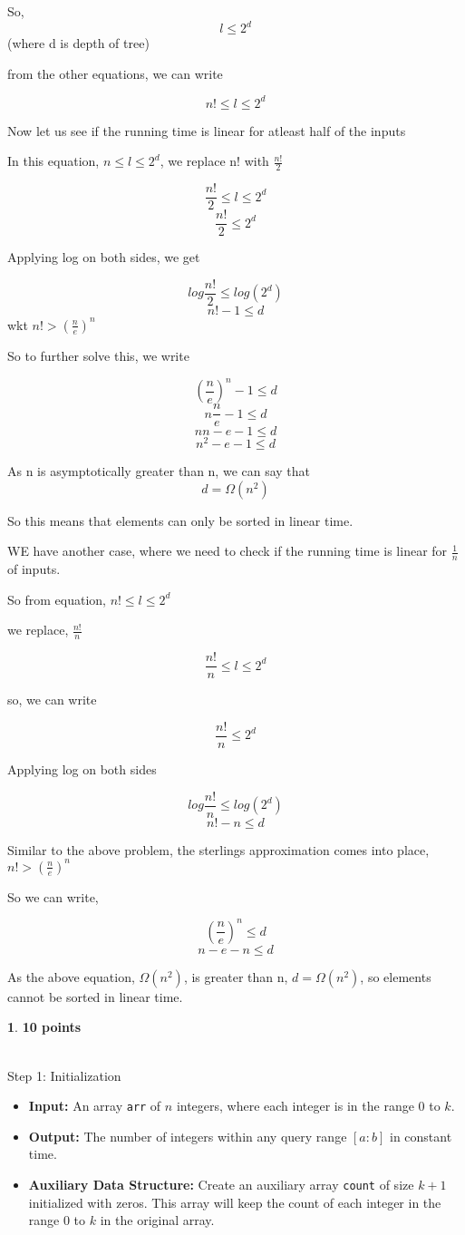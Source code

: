 \documentclass[11pt]{article}
\theoremstyle{definition}
\newtheorem{prob}{}
\newcommand{\solution}{\medskip\noindent{\color{DarkBlue}\textbf{Solution:}}}
\begin{document}
So, \[ l \leq 2^d \] 
\tabto{9cm}(where d is depth of tree)

from the other equations, we can write

\[ n! \leq l \leq 2^d \]

Now let us see if the running time is linear for atleast half of the inputs

In this equation, $n \leq l \leq 2^d$, we replace n! with $\frac{n!}{2}$

\[ \frac{n!}{2} \leq l \leq 2^d \]
\[ \frac{n!}{2} \leq 2^d \]

Applying log on both sides, we get

\[ log\frac{n!}{2} \leq log(2^d) \]
\[ n!-1 \leq d\]
\tabto{9cm} wkt $n!> (\frac{n}{e})^n$

So to further solve this, we write

\[ (\frac{n}{e})^n - 1\leq d \]
\[ n\frac{n}{e} - 1\leq d \]
\[ nn-e - 1\leq d \]
\[ n^2-e - 1\leq d \]

As n is asymptotically greater than n, we can say that
\[ d = \Omega(n^2)\]

So this means that elements can only be sorted in linear time.

WE have another case, where we need to check if the running time is linear for $\frac{1}{n}$ of inputs.

So from equation, $ n! \leq l \leq 2^d $

we replace, $\frac{n!}{n}$

\[ \frac{n!}{n} \leq l \leq 2^d \]

so, we can write

\[ \frac{n!}{n} \leq 2^d \]

Applying log on both sides

\[ log\frac{n!}{n} \leq log(2^d) \]
\[ n! -n \leq d \]

Similar to the above problem, the sterlings approximation comes into place, $ n! > (\frac{n}{e})^n$

So we can write, 

\[ (\frac{n}{e})^n \leq d\]
\[ n-e-n \leq d\]

As the above equation, $\Omega(n^2)$,  is greater than n, $d = \Omega(n^2)$, so elements cannot be sorted in linear time.

\begin{prob} \textbf{10 points}
\end{prob}
\solution \\
    Step 1: Initialization
    \begin{itemize}
        \item \textbf{Input:} An array \texttt{arr} of \(n\) integers, where each integer is in the range \(0\) to \(k\).
        \item \textbf{Output:} The number of integers within any query range \([a:b]\) in constant time.
        \item \textbf{Auxiliary Data Structure:} Create an auxiliary array \texttt{count} of size \(k+1\) initialized with zeros. This array will keep the count of each integer in the range \(0\) to \(k\) in the original array.
    \end{itemize}
    
\end{document}
